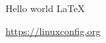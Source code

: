 \documentclass{article}
\begin{document}
Hello world \LaTeX

\url{https://linuxconfig.org}
\end{document}
